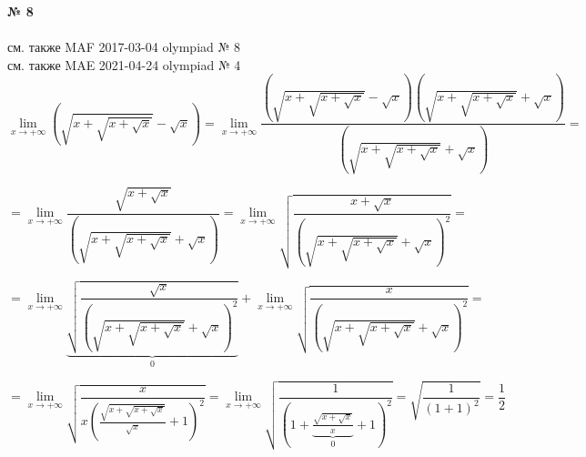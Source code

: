 \documentclass{article}
\begin{document}
\textbf{№ 8} 
\\
\\ см. также {\color{blue}MAF} 2017-03-04 olympiad № 8
\\ см. также {\color{red}MAE} 2021-04-24 olympiad № 4
\\
$$ \lim\limits_{x \to +\infty} \left(\sqrt{x+\sqrt{x+\sqrt{x}}} - \sqrt{x} \right)
= \lim\limits_{x \to +\infty} \frac{\left(\sqrt{x+\sqrt{x+\sqrt{x}}} - \sqrt{x} \right) \left(\sqrt{x+\sqrt{x+\sqrt{x}}} + \sqrt{x} \right)}{\left(\sqrt{x+\sqrt{x+\sqrt{x}}} + \sqrt{x} \right)}
= $$

$$ = \lim\limits_{x \to +\infty} \frac{\sqrt{x+\sqrt{x}}}{\left( \sqrt{x+\sqrt{x+\sqrt{x}}} + \sqrt{x} \right)}
= \lim\limits_{x \to +\infty} \sqrt{\frac{x+\sqrt{x}}{\left( \sqrt{x+\sqrt{x+\sqrt{x}}} + \sqrt{x} \right)^2}}
= $$

$$ = \lim\limits_{x \to +\infty} \underbrace{\sqrt{\frac{\sqrt{x}}{\left( \sqrt{x+\sqrt{x+\sqrt{x}}} + \sqrt{x} \right)^2}}}_{0} + \lim\limits_{x \to +\infty} \sqrt{\frac{x}{\left( \sqrt{x+\sqrt{x+\sqrt{x}}} + \sqrt{x} \right)^2}}
= $$

$$ = \lim\limits_{x \to +\infty} \sqrt{\frac{x}{x\left( \frac{\sqrt{x+\sqrt{x+\sqrt{x}}}}{\sqrt{x}} + 1 \right)^2}}
= \lim\limits_{x \to +\infty} \sqrt{\frac{1}{\left( 1 + \underbrace{\frac{\sqrt{x+\sqrt{x}}}{x}}_{0} + 1 \right)^2}}
= \sqrt{\frac{1}{(1+1)^2}} 
= \frac{1}{2} $$
\end{document}
